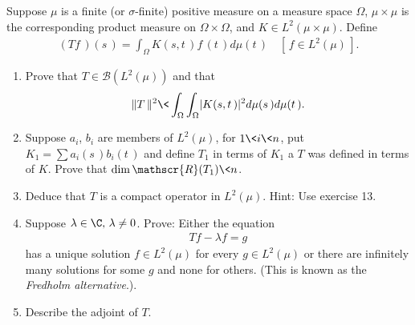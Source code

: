 { \CMUCS Suppose $\mu$ is a finite (or $\sigma$-finite) positive measure on a measure space $\Omega$, $\mu\times\mu$ is the corresponding product measure on $\Omega\times\Omega$, and $K\in L^2(\mu\times\mu)$. Define 
\begin{align*}
(Tf\,)(s\,)=\int_\Omega K(s,t\,) f\,(t\,) d\mu(t\,)\quad [\,f\in L^2(\mu)\,].
\end{align*}
\begin{enumerate}
\renewcommand{\labelenumi}{(\alph{enumi})}
\item Prove that $T\in \mathscr{B}(L^2(\mu))$ and that 
\begin{align*}
\| T\, \|^2 \< \int_\Omega\int_\Omega \lvert K (s,t\,)\rvert ^2 d\mu (s\,) d\mu(t\,).
\end{align*}
\item Suppose $a_i$, $b_i$ are members of $L^2(\mu)$, for $1\< i\< n$, put $K_1=\sum a_i(s\,)b_i(t\,)$ and define $T_1$ in terms of $K_1$ a $T$ was defined in terms of $K$. Prove that $\dim \mathscr{R}(T_1)\< n$.
\item Deduce that $T$ is a compact operator in $L^2(\mu)$. Hint: Use exercise 13.
\item Suppose $\lambda\in \C,\, \lambda\neq 0$. Prove: Either the equation 
\begin{align*}Tf-\lambda f=g\end{align*}
has a unique solution $f\in L^2(\mu)$ for every $g\in L^2(\mu)$ or there are infinitely many solutions for some $g$ and none for others. (This is known as the \textsl{Fredholm alternative}.).
\item Describe the adjoint of $T$.
 \end{enumerate}
}
